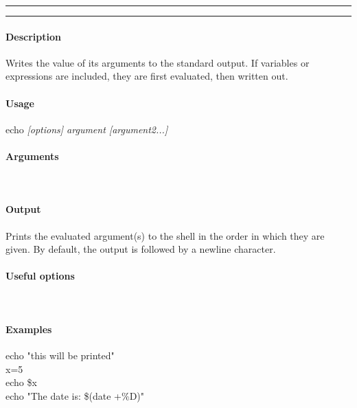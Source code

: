 \hrule
\vspace{1mm}
\hrule
\vspace{4mm}

\paragraph{Description}
\indentpar \raggedright \textrm{Writes the value of its arguments to the standard output. If variables or expressions are included, they are first evaluated, then written out.}\\

\paragraph{Usage}
\indentpar echo \textit{[options] argument [argument2...]}\\

\paragraph{Arguments}
\indentpar {}\\
\indentpar {}

\paragraph{Output}
\indentpar \textrm{Prints the evaluated argument(s) to the shell in the order in which they are given. By default, the output is followed by a newline character.}

\paragraph{Useful options}
\indentpar {}\\
\indentpar {}


\paragraph{Examples}

\indentpar echo "this will be printed"\\
\indentpar x=5\\
\indentpar echo \$x\\
\indentpar echo "The date is: \$(date +\%D)"

\vspace{20mm}